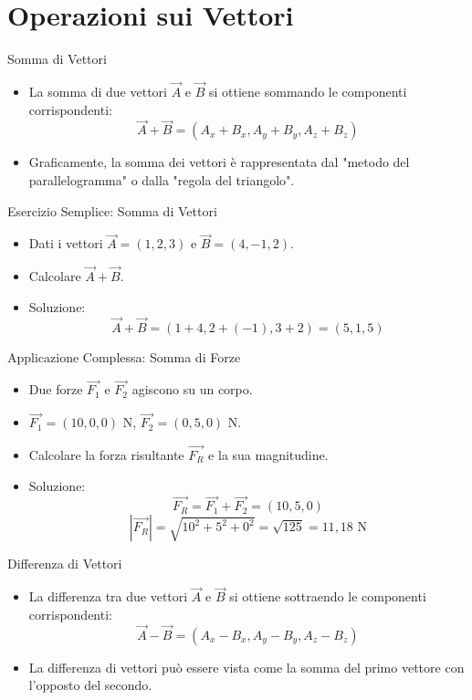 \documentclass{beamer}
\begin{document}
\section{Operazioni sui Vettori}

\begin{frame}{Somma di Vettori}
    \begin{itemize}
        \item La somma di due vettori \( \vec{A} \) e \( \vec{B} \) si ottiene sommando le componenti corrispondenti:
        \[
        \vec{A} + \vec{B} = (A_x + B_x, A_y + B_y, A_z + B_z)
        \]
        \item Graficamente, la somma dei vettori è rappresentata dal "metodo del parallelogramma" o dalla "regola del triangolo".
    \end{itemize}
\end{frame}

\begin{frame}{Esercizio Semplice: Somma di Vettori}
    \begin{itemize}
        \item Dati i vettori \( \vec{A} = (1, 2, 3) \) e \( \vec{B} = (4, -1, 2) \).
        \item Calcolare \( \vec{A} + \vec{B} \).
        \item Soluzione:
        \[
        \vec{A} + \vec{B} = (1+4, 2+(-1), 3+2) = (5, 1, 5)
        \]
    \end{itemize}
\end{frame}

\begin{frame}{Applicazione Complessa: Somma di Forze}
    \begin{itemize}
        \item Due forze \( \vec{F_1} \) e \( \vec{F_2} \) agiscono su un corpo.
        \item \( \vec{F_1} = (10, 0, 0) \) N, \( \vec{F_2} = (0, 5, 0) \) N.
        \item Calcolare la forza risultante \( \vec{F_R} \) e la sua magnitudine.
        \item Soluzione:
        \[
        \vec{F_R} = \vec{F_1} + \vec{F_2} = (10, 5, 0)
        \]
        \[
        |\vec{F_R}| = \sqrt{10^2 + 5^2 + 0^2} = \sqrt{125} = 11,18 \text{ N}
        \]
    \end{itemize}
\end{frame}

\begin{frame}{Differenza di Vettori}
    \begin{itemize}
        \item La differenza tra due vettori \( \vec{A} \) e \( \vec{B} \) si ottiene sottraendo le componenti corrispondenti:
        \[
        \vec{A} - \vec{B} = (A_x - B_x, A_y - B_y, A_z - B_z)
        \]
        \item La differenza di vettori può essere vista come la somma del primo vettore con l'opposto del secondo.
    \end{itemize}
\end{frame}
\end{document}
